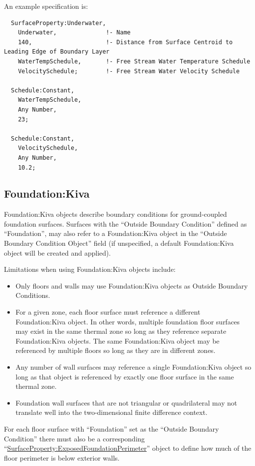 An example specification is:

\begin{lstlisting}
  SurfaceProperty:Underwater,
    Underwater,              !- Name
    140,                     !- Distance from Surface Centroid to Leading Edge of Boundary Layer
    WaterTempSchedule,       !- Free Stream Water Temperature Schedule
    VelocitySchedule;        !- Free Stream Water Velocity Schedule

  Schedule:Constant,
    WaterTempSchedule,
    Any Number,
    23;

  Schedule:Constant,
    VelocitySchedule,
    Any Number,
    10.2;
\end{lstlisting}

\subsection{Foundation:Kiva}\label{foundationkiva}

Foundation:Kiva objects describe boundary conditions for ground-coupled
foundation surfaces. Surfaces with the ``Outside Boundary Condition''
defined as ``Foundation'', may also refer to a Foundation:Kiva object in
the ``Outside Boundary Condition Object'' field (if unspecified, a
default Foundation:Kiva object will be created and applied).

Limitations when using Foundation:Kiva objects include:

\begin{itemize}
\tightlist
\item
  Only floors and walls may use Foundation:Kiva objects as Outside
  Boundary Conditions.
\item
  For a given zone, each floor surface must reference a different Foundation:Kiva object. In other words, multiple foundation floor surfaces may exist in the same thermal zone so long as they reference separate Foundation:Kiva objects. The same Foundation:Kiva object may be referenced by multiple floors so long as they are in different zones.
\item
  Any number of wall surfaces may reference a single Foundation:Kiva object so long as that object is referenced by exactly one floor surface in the same thermal zone.
\item
  Foundation wall surfaces that are not triangular or quadrilateral may not
  translate well into the two-dimensional finite difference context.
\end{itemize}

For each floor surface with ``Foundation'' set as the ``Outside Boundary Condition''
there must also be a corresponding ``\hyperref[surfaceproperty-exposedfoundationperimeter]{SurfaceProperty:ExposedFoundationPerimeter}''
object to define how much of the floor perimeter is below exterior walls.

